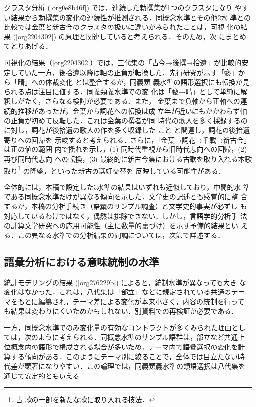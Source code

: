 \documentclass[submit]{ipsj}
\renewcommand{\ref}{\cref}
\begin{document}
クラスタ分析 (\ref{org0e8b46f}) では，連続した勅撰集が1つのクラスタになり
やすい結果から勅撰集の変化の連続性が推測される．同概念水準とその他2水
準との比較では金葉と新古今のクラスタの扱いに違いがみられたことは，可視
化の結果 (\ref{org2204302}) の原理と関連していると考えられる．そのため，次
にまとめてとりあげる．

可視化の結果（\ref{org2204302}）では，三代集の「古今→後撰→拾遺」が比較的安
定していた一方，後拾遺以降は軸の正負が転換した．先行研究が示す「褻」か
ら「晴」への体裁変化 \cite{ueno1976Koshui} とは整合するが，同義類
義水準の語形選択にも転換が見られる点は注目に値する．同義類義水準での変
化は「褻→晴」として単純に解釈しがたく，さらなる検討が必要である．また，
金葉まで負軸から正軸への連続的推移があったが，金葉から詞花への転換は成
立年が近いにもかかわらず軸の正負が初めて反転した．これは金葉の撰者が同
時代の歌人を多く採録するのに対し，詞花が後拾遺の歌人の作を多く収録した
こと \cite{matsuda1939Shika} と関連し，詞花の後拾遺寄りへの回帰を
示唆すると考えられる．さらに，「金葉→詞花→千載→新古今」は正の値の範囲
内で揺れを示し，(1) 同時代重視から旧時代志向への回帰，(2) 再び同時代志向
への転換，(3) 最終的に新古今集における古歌を取り入れる本歌取り\footnote{古
歌の一部を新たな歌に取り入れる技法．} の隆盛，といった新古の選好交替を
反映している可能性がある．

全体的には，本稿で設定した3水準の結果はいずれも近似しており，中間的水
準である同概念水準だけが異なる傾向を示した．文学史の記述とも感覚的に整
合するが，本稿の分析手続き（語彙のサンプル調査）と文学史的事実が必ずし
も対応しているわけではなく，偶然は排除できない．しかし，言語学的分析手
法の計算文学研究への応用可能性（主に数量的裏づけ）を示す予備的結果とい
える．この異なる水準での分析結果の同調については，次節で詳述する．
\subsection{語彙分析における意味統制の水準\label{orga319914}}
\label{sec:org0ed6a49}
統計モデリングの結果 (\ref{org276229b}) によると，統制水準が異なっても大き
な変化はなかった．これは，八代集は「部立」などに規定されている共通のテー
マをもとに編纂され，テーマ差による変化が本来小さく，内容の統制を行って
も結果は変わりにくいためかもしれない．別資料での再検証が必要である．

一方，同概念水準でのみ変化量の有効なコントラクトが多くみられた理由とし
ては，次のように考えられる．同概念水準のサンプル語群は，部立など共通上
位概念内の語形で構成される場合が多いため，テーマ内で語彙選択の変化を計
算する傾向がある．このようにテーマ別に絞ることで，全体では目立たない時
代差が顕著になりやすい．この論理では，同義類義水準の類語選択は八代集を
通じて安定的ともいえる．
\end{document}
